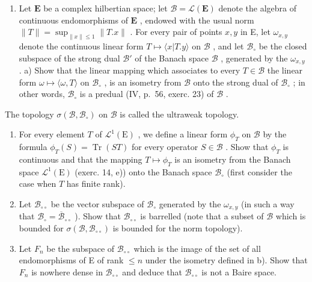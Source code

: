 \begin{enumerate}
\def\labelenumi{\arabic{enumi})}
\setcounter{enumi}{14}
\tightlist
\item
  Let \(\mathbf{E}\) be a complex hilbertian space; let \(\mathcal{B} = \mathcal{L}(\mathbf{E})\) denote the algebra of continuous endomorphisms of \(\mathbf{E}\) , endowed with the usual norm \(\| T\| = \sup_{\| x\| \leqslant 1}\| T.x\|\) . For every pair of points \(x, y\) in E, let \(\omega_{x,y}\) denote the continuous linear form \(T \mapsto \langle x|T.y \rangle\) on \(\mathcal{B}\) , and let \(\mathcal{B}_{\circ}\) be the closed subspace of the strong dual \(\mathcal{B}'\) of the Banach space \(\mathcal{B}\) , generated by the \(\omega_{x,y}\) . a) Show that the linear mapping which associates to every \(T \in \mathcal{B}\) the linear form \(\omega \mapsto \langle \omega, T \rangle\) on \(\mathcal{B}_{\circ}\) , is an isometry from \(\mathcal{B}\) onto the strong dual of \(\mathcal{B}_{\circ}\) ; in other words, \(\mathcal{B}_{\circ}\) is a predual (IV, p.~56, exerc. 23) of \(\mathcal{B}\) .
\end{enumerate}

The topology \(\sigma (\mathcal{B},\mathcal{B}_{\circ})\) on \(\mathcal{B}\) is called the ultraweak topology.

\begin{enumerate}
\def\labelenumi{\alph{enumi})}
\setcounter{enumi}{1}
\item
  For every element \(T\) of \(\mathcal{L}^1(\mathrm{E})\) , we define a linear form \(\phi_T\) on \(\mathcal{B}\) by the formula \(\phi_T(S) = \operatorname{Tr}(ST)\) for every operator \(S \in \mathcal{B}\) . Show that \(\phi_T\) is continuous and that the mapping \(T \mapsto \phi_T\) is an isometry from the Banach space \(\mathcal{L}^1(\mathrm{E})\) (exerc. 14, e)) onto the Banach space \(\mathcal{B}_{\circ}\) (first consider the case when \(T\) has finite rank).
\item
  Let \(\mathcal{B}_{\circ \circ}\) be the vector subspace of \(\mathcal{B}_{\circ}\) generated by the \(\omega_{x,y}\) (in such a way that \(\mathcal{B}_{\circ} = \overline{\mathcal{B}}_{\circ \circ} \) ). Show that \(\mathcal{B}_{\circ \circ}\) is barrelled (note that a subset of \(\mathcal{B}\) which is bounded for \(\sigma (\mathcal{B},\mathcal{B}_{\circ \circ})\) is bounded for the norm topology).
\item
  Let \(F_{n}\) be the subspace of \(\mathcal{B}_{\circ \circ}\) which is the image of the set of all endomorphisms of E of rank \(\leqslant n\) under the isometry defined in b). Show that \(F_{n}\) is nowhere dense in \(\mathcal{B}_{\circ \circ}\) and deduce that \(\mathcal{B}_{\circ \circ}\) is not a Baire space.
\end{enumerate}

\backmatter
